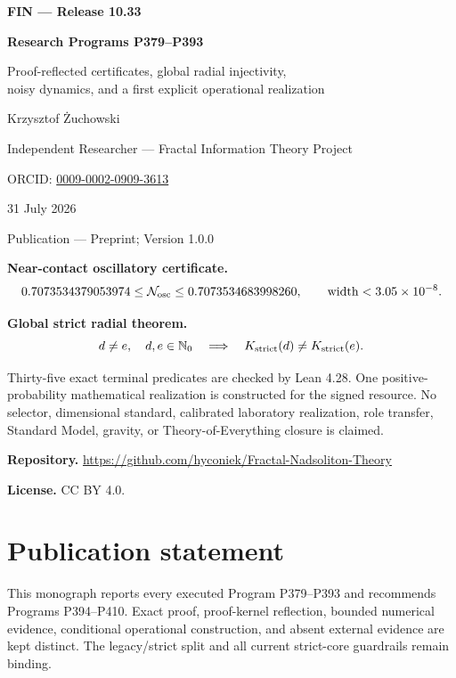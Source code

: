 \documentclass[11pt,a4paper,openany]{report}
\begin{document}
\hypersetup{pageanchor=false}
\begin{titlepage}
\centering
\vspace*{7mm}
{\Large\bfseries FIN --- Release 10.33\par}
\vspace{9mm}
{\Huge\bfseries Research Programs P379--P393\par}
\vspace{6mm}
{\Large Proof-reflected certificates, global radial injectivity,\\
noisy dynamics, and a first explicit operational realization\par}
\vspace{13mm}
{\Large Krzysztof \.Zuchowski\par}
\vspace{2mm}
{\normalsize Independent Researcher --- Fractal Information Theory Project\par}
\vspace{2mm}
{\normalsize ORCID:
\href{https://orcid.org/0009-0002-0909-3613}{0009-0002-0909-3613}\par}
\vspace{7mm}
{\large 31 July 2026\par}
{\normalsize Publication --- Preprint; Version 1.0.0\par}
\vfill
\begin{minipage}{0.92\textwidth}
\small
\textbf{Near-contact oscillatory certificate.}
\[
0.7073534379053974
\leq\mathcal N_{\rm osc}
\leq0.7073534683998260,
\qquad
\operatorname{width}<3.05\times10^{-8}.
\]

\textbf{Global strict radial theorem.}
\[
d\neq e,\quad d,e\in\mathbb N_0
\quad\Longrightarrow\quad
K_{\rm strict}(d)\neq K_{\rm strict}(e).
\]

Thirty-five exact terminal predicates are checked by Lean 4.28. One
positive-probability mathematical realization is constructed for the signed
resource. No selector, dimensional standard, calibrated laboratory
realization, role transfer, Standard Model, gravity, or Theory-of-Everything
closure is claimed.

\medskip
\textbf{Repository.}
\url{https://github.com/hyconiek/Fractal-Nadsoliton-Theory}

\textbf{License.} CC BY 4.0.
\end{minipage}
\vfill
\end{titlepage}
\hypersetup{pageanchor=true}
\chapter*{Publication statement}
This monograph reports every executed Program P379--P393 and recommends
Programs P394--P410. Exact proof, proof-kernel reflection, bounded numerical
evidence, conditional operational construction, and absent external evidence
are kept distinct. The legacy/strict split and all current strict-core
guardrails remain binding.
\end{document}
